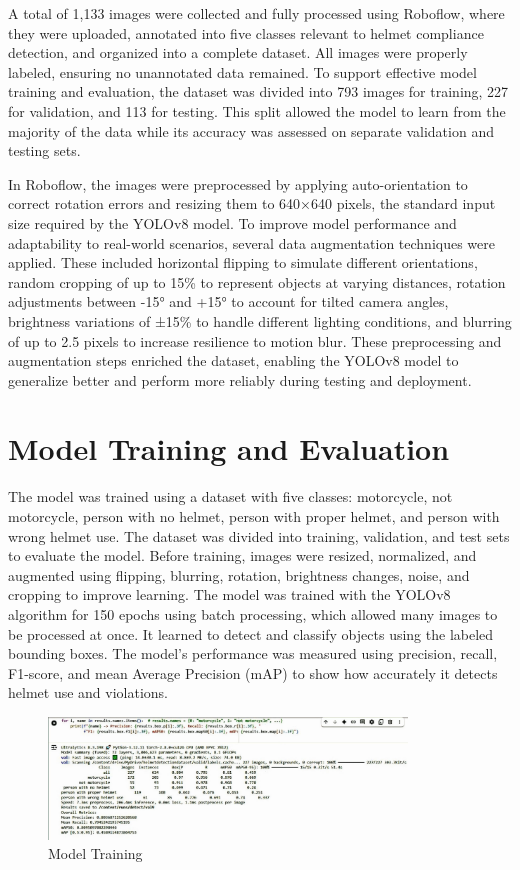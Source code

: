 \begin{refsection}
\begin{refsection}
A total of 1,133 images were collected and fully processed using Roboflow, where they were uploaded, annotated into five classes relevant to helmet compliance detection, and organized into a complete dataset. All images were properly labeled, ensuring no unannotated data remained. To support effective model training and evaluation, the dataset was divided into 793 images for training, 227 for validation, and 113 for testing. This split allowed the model to learn from the majority of the data while its accuracy was assessed on separate validation and testing sets.

In Roboflow, the images were preprocessed by applying auto-orientation to correct rotation errors and resizing them to 640×640 pixels, the standard input size required by the YOLOv8 model. To improve model performance and adaptability to real-world scenarios, several data augmentation techniques were applied. These included horizontal flipping to simulate different orientations, random cropping of up to 15\% to represent objects at varying distances, rotation adjustments between -15° and +15° to account for tilted camera angles, brightness variations of ±15\% to handle different lighting conditions, and blurring of up to 2.5 pixels to increase resilience to motion blur. These preprocessing and augmentation steps enriched the dataset, enabling the YOLOv8 model to generalize better and perform more reliably during testing and deployment.

\section{Model Training and Evaluation}
\noindent
The model was trained using a dataset with five classes: motorcycle, not motorcycle, person with no helmet, person with proper helmet, and person with wrong helmet use. The dataset was divided into training, validation, and test sets to evaluate the model. Before training, images were resized, normalized, and augmented using flipping, blurring, rotation, brightness changes, noise, and cropping to improve learning. The model was trained with the YOLOv8 algorithm for 150 epochs using batch processing, which allowed many images to be processed at once. It learned to detect and classify objects using the labeled bounding boxes. The model’s performance was measured using precision, recall, F1-score, and mean Average Precision (mAP) to show how accurately it detects helmet use and violations.

\begin{figure}[ht]
    \centering
	\includegraphics[width=0.85\textwidth]{figures/Fig 13.jpg}
	\caption[Model Training]{Model Training}
	\label{fig:model_training}
\end{figure}


\end{refsection}
\end{refsection}
